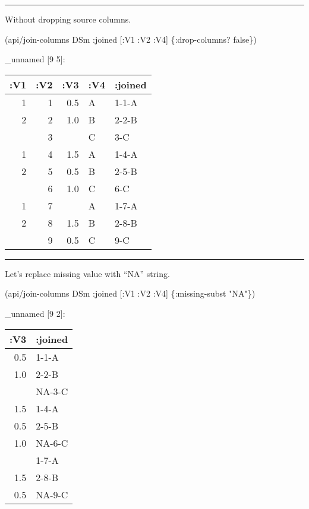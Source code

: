 \documentclass[]{article}
\newenvironment{Shaded}{\begin{snugshade}}{\end{snugshade}}
\newcommand{\StringTok}[1]{\textcolor[rgb]{0.31,0.60,0.02}{#1}}
\newcommand{\VariableTok}[1]{\textcolor[rgb]{0.00,0.00,0.00}{#1}}
\newcommand{\AttributeTok}[1]{\textcolor[rgb]{0.77,0.63,0.00}{#1}}
\newcommand{\NormalTok}[1]{#1}
\begin{document}
\begin{center}\rule{0.5\linewidth}{0.5pt}\end{center}

Without dropping source columns.

\begin{Shaded}
\begin{Highlighting}[]
\NormalTok{(api/join-columns DSm }\AttributeTok{:joined}\NormalTok{ [}\AttributeTok{:V1} \AttributeTok{:V2} \AttributeTok{:V4}\NormalTok{] \{}\AttributeTok{:drop-columns}\NormalTok{? }\VariableTok{false}\NormalTok{\})}
\end{Highlighting}
\end{Shaded}

\_unnamed {[}9 5{]}:

\begin{longtable}[]{@{}rrrll@{}}
\toprule
:V1 & :V2 & :V3 & :V4 & :joined\tabularnewline
\midrule
\endhead
1 & 1 & 0.5 & A & 1-1-A\tabularnewline
2 & 2 & 1.0 & B & 2-2-B\tabularnewline
& 3 & & C & 3-C\tabularnewline
1 & 4 & 1.5 & A & 1-4-A\tabularnewline
2 & 5 & 0.5 & B & 2-5-B\tabularnewline
& 6 & 1.0 & C & 6-C\tabularnewline
1 & 7 & & A & 1-7-A\tabularnewline
2 & 8 & 1.5 & B & 2-8-B\tabularnewline
& 9 & 0.5 & C & 9-C\tabularnewline
\bottomrule
\end{longtable}

\begin{center}\rule{0.5\linewidth}{0.5pt}\end{center}

Let's replace missing value with ``NA'' string.

\begin{Shaded}
\begin{Highlighting}[]
\NormalTok{(api/join-columns DSm }\AttributeTok{:joined}\NormalTok{ [}\AttributeTok{:V1} \AttributeTok{:V2} \AttributeTok{:V4}\NormalTok{] \{}\AttributeTok{:missing-subst} \StringTok{"NA"}\NormalTok{\})}
\end{Highlighting}
\end{Shaded}

\_unnamed {[}9 2{]}:

\begin{longtable}[]{@{}rl@{}}
\toprule
:V3 & :joined\tabularnewline
\midrule
\endhead
0.5 & 1-1-A\tabularnewline
1.0 & 2-2-B\tabularnewline
& NA-3-C\tabularnewline
1.5 & 1-4-A\tabularnewline
0.5 & 2-5-B\tabularnewline
1.0 & NA-6-C\tabularnewline
& 1-7-A\tabularnewline
1.5 & 2-8-B\tabularnewline
0.5 & NA-9-C\tabularnewline
\bottomrule
\end{longtable}
\end{document}

